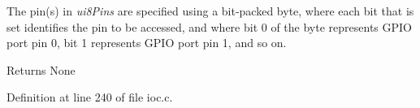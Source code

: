 The pin(s) in {\itshape ui8\+Pins} are specified using a bit-\/packed byte, where each bit that is set identifies the pin to be accessed, and where bit 0 of the byte represents G\+P\+IO port pin 0, bit 1 represents G\+P\+IO port pin 1, and so on.

\begin{DoxyReturn}{Returns}
None 
\end{DoxyReturn}


Definition at line 240 of file ioc.\+c.

